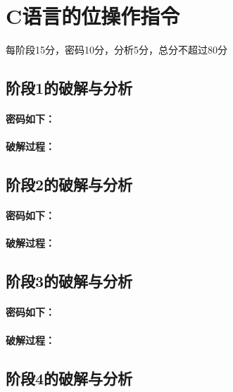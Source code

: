 \section{C语言的位操作指令}
\begin{center}
    每阶段15分，密码10分，分析5分，总分不超过80分
\end{center}

\subsection{阶段1的破解与分析}

\paragraph{密码如下：}

\paragraph{破解过程：}

\subsection{阶段2的破解与分析}

\paragraph{密码如下：}

\paragraph{破解过程：}

\subsection{阶段3的破解与分析}

\paragraph{密码如下：}

\paragraph{破解过程：}

\subsection{阶段4的破解与分析}

